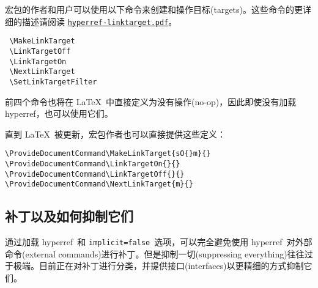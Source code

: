 \documentclass{article}
\newcommand*{\xpackage}[1]{\textsf{#1}}
\begin{document}
宏包的作者和用户可以使用以下命令来创建和操作目标(targets)。这些命令的更详细的描述请阅读 \href{run:hyperref-linktarget.pdf}{\texttt{hyperref-linktarget.pdf}}。

\begin{verbatim}
 \MakeLinkTarget
 \LinkTargetOff
 \LinkTargetOn
 \NextLinkTarget
 \SetLinkTargetFilter
\end{verbatim}

前四个命令也将在 \LaTeX{}\ 中直接定义为没有操作(no-op)，因此即使没有加载 \xpackage{hyperref}，也可以使用它们。

直到 \LaTeX{}\ 被更新，宏包作者也可以直接提供这些定义：

\begin{verbatim}
\ProvideDocumentCommand\MakeLinkTarget{sO{}m}{}
\ProvideDocumentCommand\LinkTargetOn{}{}
\ProvideDocumentCommand\LinkTargetOff{}{}
\ProvideDocumentCommand\NextLinkTarget{m}{}
\end{verbatim}

\subsection[补丁以及如何抑制它们]{\heiti 补丁以及如何抑制它们}

通过加载 \xpackage{hyperref}\ 和 \texttt{implicit=false}\ 选项，可以完全避免使用 \xpackage{hyperref}\ 对外部命令(external commands)进行补丁。但是抑制一切(suppressing everything)往往过于极端。目前正在对补丁进行分类，并提供接口(interfaces)以更精细的方式抑制它们。
\end{document}

